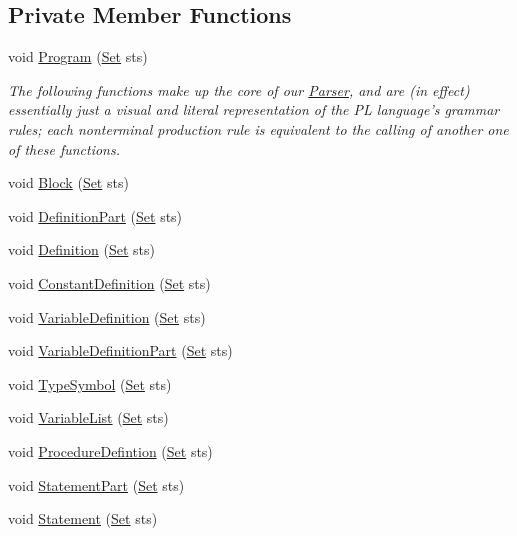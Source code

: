 \subsection*{Private Member Functions}
\begin{DoxyCompactItemize}
\item 
void \hyperlink{classParser_a068fd2e519704d6fbaf9c8ecb3469e49}{Program} (\hyperlink{classSet}{Set} sts)
\begin{DoxyCompactList}\small\item\em The following functions make up the core of our \hyperlink{classParser}{Parser}, and are (in effect) essentially just a visual and literal representation of the PL language's grammar rules; each nonterminal production rule is equivalent to the calling of another one of these functions. \item\end{DoxyCompactList}\item 
void \hyperlink{classParser_a4d583a4596c19faf368265ec1948a42e}{Block} (\hyperlink{classSet}{Set} sts)
\item 
void \hyperlink{classParser_a481fd10039485563c664099d5ace6428}{DefinitionPart} (\hyperlink{classSet}{Set} sts)
\item 
void \hyperlink{classParser_aef0bb75e13a569ffde9f8a56625aeb41}{Definition} (\hyperlink{classSet}{Set} sts)
\item 
void \hyperlink{classParser_abb393c5891c5a48e7be396bb6249ee4b}{ConstantDefinition} (\hyperlink{classSet}{Set} sts)
\item 
void \hyperlink{classParser_a08145dddc145745970fe4849aa667e05}{VariableDefinition} (\hyperlink{classSet}{Set} sts)
\item 
void \hyperlink{classParser_aca0b05f8805667f5057d695ee157ab74}{VariableDefinitionPart} (\hyperlink{classSet}{Set} sts)
\item 
void \hyperlink{classParser_a0bb180ec60cb61345a7890c8766f0048}{TypeSymbol} (\hyperlink{classSet}{Set} sts)
\item 
void \hyperlink{classParser_a6bd20fada4e59e17e0f2b00ec5e86ae1}{VariableList} (\hyperlink{classSet}{Set} sts)
\item 
void \hyperlink{classParser_a0f04e446170cd685f2ab8ecb6782025f}{ProcedureDefintion} (\hyperlink{classSet}{Set} sts)
\item 
void \hyperlink{classParser_ac3ae7245f6ecc00a9e14cbed66a0b347}{StatementPart} (\hyperlink{classSet}{Set} sts)
\item 
void \hyperlink{classParser_a23d5c23531d92c7249034a9e637b4467}{Statement} (\hyperlink{classSet}{Set} sts)

\end{DoxyCompactItemize}
